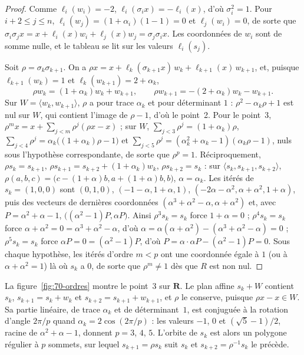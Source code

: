 \begin{proof}
Comme $\ell_i(w_i) = -2$, $\ell_i(\sigma_i x) = -\ell_i(x)$, d'où $\sigma_i^2 = 1$. Pour $i + 2 \leq j \leq n$, $\ell_i(w_j) = (1 + \alpha_i)(1 - 1) = 0$ et $\ell_j(w_i) = 0$, de sorte que $\sigma_i\sigma_j x = x + \ell_i(x) w_i + \ell_j(x) w_j = \sigma_j\sigma_i x$. Les coordonnées de $w_i$ sont de somme nulle, et le tableau se lit sur les valeurs $\ell_i(s_j)$.

Soit $\rho = \sigma_k\sigma_{k+1}$. On a $\rho x = x + \ell_k(\sigma_{k+1}x)\, w_k + \ell_{k+1}(x)\, w_{k+1}$, et, puisque $\ell_{k+1}(w_k) = 1$ et $\ell_k(w_{k+1}) = 2 + \alpha_k$,
\[
\rho w_k = (1 + \alpha_k) w_k + w_{k+1}, \qquad \rho w_{k+1} = -(2 + \alpha_k) w_k - w_{k+1}.
\]
Sur $W = \langle w_k, w_{k+1}\rangle$, $\rho$ a pour trace $\alpha_k$ et pour déterminant $1$ : $\rho^2 - \alpha_k\rho + 1$ est nul sur $W$, qui contient l'image de $\rho - 1$, d'où le point~2. Pour le point~3, $\rho^m x = x + \sum_{j < m} \rho^j(\rho x - x)$ ; sur $W$, $\sum_{j < 3} \rho^j = (1 + \alpha_k)\rho$, $\sum_{j < 4} \rho^j = \alpha_k\bigl((1 + \alpha_k)\rho - 1\bigr)$ et $\sum_{j < 5} \rho^j = (\alpha_k^2 + \alpha_k - 1)(\alpha_k\rho - 1)$, nuls sous l'hypothèse correspondante, de sorte que $\rho^p = 1$. Réciproquement, $\rho s_k = s_{k+1}$, $\rho s_{k+1} = s_{k+2} + (1 + \alpha_k) w_k$, $\rho s_{k+2} = s_k$ : sur $\langle s_k, s_{k+1}, s_{k+2}\rangle$, $\rho(a, b, c) = \bigl(c - (1 + \alpha)b, a + (1 + \alpha)b, b\bigr)$, $\alpha = \alpha_k$. Les itérés de $s_k = (1, 0, 0)$ sont $(0, 1, 0)$, $(-1 - \alpha, 1 + \alpha, 1)$, $(-2\alpha - \alpha^2, \alpha + \alpha^2, 1 + \alpha)$, puis des vecteurs de dernières coordonnées $(\alpha^3 + \alpha^2 - \alpha, \alpha + \alpha^2)$ et, avec $P = \alpha^2 + \alpha - 1$, $\bigl((\alpha^2 - 1)P, \alpha P\bigr)$. Ainsi $\rho^3 s_k = s_k$ force $1 + \alpha = 0$ ; $\rho^4 s_k = s_k$ force $\alpha + \alpha^2 = 0 = \alpha^3 + \alpha^2 - \alpha$, d'où $\alpha = \alpha(\alpha + \alpha^2) - (\alpha^3 + \alpha^2 - \alpha) = 0$ ; $\rho^5 s_k = s_k$ force $\alpha P = 0 = (\alpha^2 - 1)P$, d'où $P = \alpha \cdot \alpha P - (\alpha^2 - 1)P = 0$. Sous chaque hypothèse, les itérés d'ordre $m < p$ ont une coordonnée égale à $1$ (ou à $\alpha + \alpha^2 = 1$) là où $s_k$ a $0$, de sorte que $\rho^m \neq 1$ dès que $R$ est non nul.
\end{proof}

La figure~\ref{fig:70-ordres} montre le point~3 sur $\mathbf R$. Le plan affine $s_k + W$ contient $s_k$, $s_{k+1} = s_k + w_k$ et $s_{k+2} = s_{k+1} + w_{k+1}$, et $\rho$ le conserve, puisque $\rho x - x \in W$. Sa partie linéaire, de trace $\alpha_k$ et de déterminant~$1$, est conjuguée à la rotation d'angle $2\pi/p$ quand $\alpha_k = 2\cos(2\pi/p)$ : les valeurs $-1$, $0$ et $(\sqrt 5 - 1)/2$, racine de $\alpha^2 + \alpha - 1$, donnent $p = 3$, $4$, $5$. L'orbite de $s_k$ est alors un polygone régulier à $p$ sommets, sur lequel $s_{k+1} = \rho s_k$ suit $s_k$ et $s_{k+2} = \rho^{-1} s_k$ le précède.

